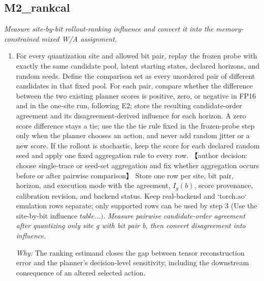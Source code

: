 \documentclass[10pt,a4paper]{article}
\begin{document}
\subsection*{M2\_rankcal}
\emph{Measure site-by-bit rollout-ranking influence and convert it into the memory-constrained mixed W/A assignment.}
\begin{enumerate}[leftmargin=*,start=2]
  \item For every quantization site and allowed bit pair, replay the frozen probe with exactly the same candidate pool, latent starting states, declared horizons, and random seeds. Define the comparison set as every unordered pair of different candidates in that fixed pool. For each pair, compare whether the difference between the two existing planner scores is positive, zero, or negative in FP16 and in the one-site run, following E2;\allowbreak{} store the resulting candidate-order agreement and its disagreement-derived influence for each horizon. A zero score difference stays a tie;\allowbreak{} use the the tie rule fixed in the frozen-probe step only when the planner chooses an action, and never add random jitter or a new score. If the rollout is stochastic, keep the score for each declared random seed and apply one fixed aggregation rule to every row. 【author decision: choose single-trace or seed-set aggregation and fix whether aggregation occurs before or after pairwise comparison】 Store one row per site, bit pair, horizon, and execution mode with the agreement, \(I_{g}(b)\), score provenance, calibration revision, and backend status. Keep real-backend and `torch.ao` emulation rows separate;\allowbreak{} only supported rows can be used by step 3 (Use the site-by-bit influence \(table\dots )\).
\noindent\emph{Measure pairwise candidate-order agreement after quantizing only site g with bit pair b, then convert disagreement into influence.}
\par{}
\par\emph{Why:} The ranking estimand closes the gap between tensor reconstruction error and the planner's decision-level sensitivity, including the downstream consequence of an altered selected action.

\end{enumerate}
\end{document}
